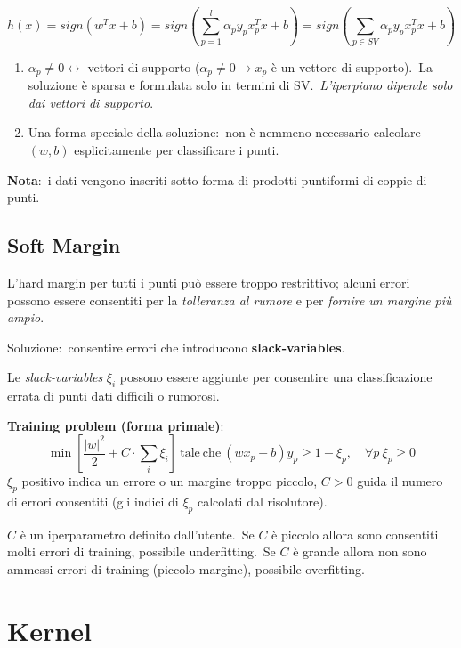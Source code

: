 \[h(x) = \mathit{sign}(w^Tx +b) = \mathit{sign}\left(\sum_{p=1}^l \alpha_py_px^T_px +b\right) = \mathit{sign}\left(\sum_{p\in \mathit{SV}}\alpha_py_px^T_px +b\right)\]
\begin{enumerate}
	\item $\alpha_p \neq 0 \leftrightarrow$ vettori di supporto ($\alpha_p \neq 0 \rightarrow x_p$ è un vettore di supporto).\ La soluzione è sparsa e formulata solo in termini di SV.\ \textit{L'iperpiano dipende solo dai vettori di supporto}.
	\item Una forma speciale della soluzione:\ non è nemmeno necessario calcolare $(w, b)$ esplicitamente per classificare i punti.
\end{enumerate}

\noindent \textbf{Nota}:\ i dati vengono inseriti sotto forma di prodotti puntiformi di coppie di punti.

\subsection{Soft Margin}

L'hard margin per tutti i punti può essere troppo restrittivo; alcuni errori possono essere consentiti per la \textit{tolleranza al rumore} e per \textit{fornire un margine più ampio}.\

\begin{center}
	Soluzione:\ consentire errori che introducono \textbf{slack-variables}.
\end{center}

\noindent Le \textit{slack-variables} $\xi_i$ possono essere aggiunte per consentire una classificazione errata di punti dati difficili o rumorosi.

\begin{flushleft}
	\textbf{Training problem (forma primale)}:
	\[\min\left[\frac{|w|^2}{2} + C\cdot\sum_i\xi_i\right]\ \mathrm{tale\ che}\ (wx_p + b) y_p \geq 1 - \xi_p,\quad \forall p\ \xi_p\geq 0\]
	$\xi_p$ positivo indica un errore o un margine troppo piccolo, $C> 0$ guida il numero di errori consentiti (gli indici di $\xi_p$ calcolati dal risolutore).
\end{flushleft}

\noindent $C$ è un iperparametro definito dall'utente.\
Se $C$ è piccolo allora sono consentiti molti errori di training, possibile underfitting.\
Se $C$ è grande allora non sono ammessi errori di training (piccolo margine), possibile overfitting.\

\section{Kernel}

